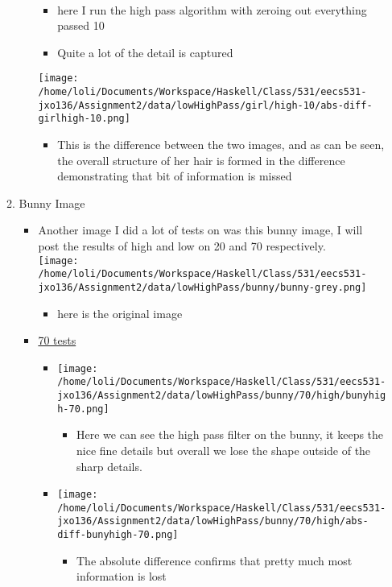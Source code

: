 \documentclass{article}
\begin{document}
\begin{enumerate}
\begin{enumerate}
\begin{itemize}
  \\
\begin{itemize}
\item here Ι run the high pass algorithm with zeroing out everything
passed 10
\item Quite a lot of the detail is captured
\end{itemize}
\texttt{[image: /home/loli/Documents/Workspace/Haskell/Class/531/eecs531-jxo136/Assignment2/data/lowHighPass/girl/high-10/abs-diff-girlhigh-10.png]}
\begin{itemize}
\item This is the difference between the two images, and as can be seen,
the overall structure of her hair is formed in the difference
demonstrating that bit of information is missed
\end{itemize}
\end{itemize}
\item Bunny Image
\label{sec-1-3-2}
\begin{itemize}
\item Another image I did a lot of tests on was this bunny image, I will
post the results of high and low on 20 and 70 respectively. \\
  \texttt{[image: /home/loli/Documents/Workspace/Haskell/Class/531/eecs531-jxo136/Assignment2/data/lowHighPass/bunny/bunny-grey.png]}
\begin{itemize}
\item here is the original image
\end{itemize}
\item \uline{70 tests}
\begin{itemize}
\item \texttt{[image: /home/loli/Documents/Workspace/Haskell/Class/531/eecs531-jxo136/Assignment2/data/lowHighPass/bunny/70/high/bunyhigh-70.png]}
\begin{itemize}
\item Here we can see the high pass filter on the bunny, it keeps the
nice fine details but overall we lose the shape outside of the
sharp details.
\end{itemize}
\item \texttt{[image: /home/loli/Documents/Workspace/Haskell/Class/531/eecs531-jxo136/Assignment2/data/lowHighPass/bunny/70/high/abs-diff-bunyhigh-70.png]}
\begin{itemize}
\item The absolute difference confirms that pretty much most
information is lost

\end{itemize}
\end{itemize}
\end{itemize}
\end{enumerate}
\end{enumerate}
\end{document}
